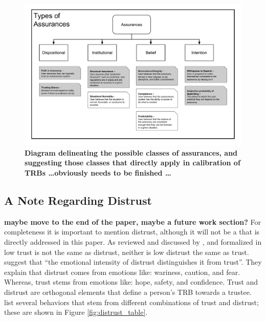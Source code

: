         \begin{figure}
            \includegraphics[width=8in]{Figures/Assurances.pdf}%
            \caption{\textbf{Diagram delineating the possible classes of assurances, and suggesting those classes that directly apply in calibration of TRBs \ldots obviously needs to be finished \ldots}}
            \label{fig:Assurance_classes}
        \end{figure}

    \subsection{A Note Regarding Distrust}
    \textbf{maybe move to the end of the paper, maybe a future work section?}
        For completeness it is important to mention distrust, although it will not be a that is directly addressed in this paper. As reviewed and discussed by \citet{Lewicki1998-ox}, and formalized in \cite{McKnight2001-hm,McKnight2001-gz} low trust is not the same as distrust, neither is low distrust the same as trust. \citet{McKnight2001-gz} suggest that ``the emotional intensity of distrust distinguishes it from trust''. They explain that distrust comes from emotions like: wariness, caution, and fear. Whereas, trust stems from emotions like: hope, safety, and confidence. Trust and distrust are orthogonal elements that define a person's TRB towards a trustee. \citet{Lewicki1998-ox} list several behaviors that stem from different combinations of trust and distrust; these are shown in Figure \ref{fig:distrust_table}.

